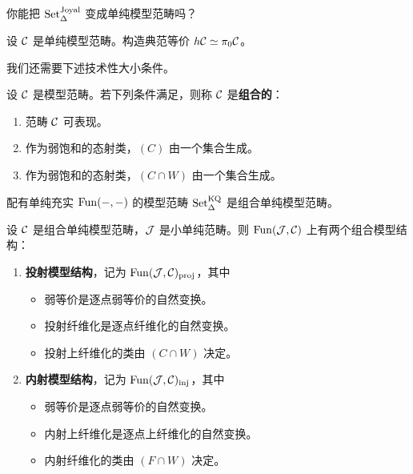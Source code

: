 \begin{exercise}\label{L8-2.5}
你能把 $\operatorname{Set}^{\mathrm{Joyal}}_\Delta$ 变成单纯模型范畴吗？
\end{exercise}

\begin{exercise}\label{L8-2.6}
设 $\mathcal{C}$ 是单纯模型范畴。构造典范等价 $h\mathcal{C}\simeq \pi_0\mathcal{C}$。
\end{exercise}

\nitem\label{L8-2.7} 我们还需要下述技术性大小条件。

\begin{definition}[HTT.A.2.6.1]\label{L8-2.8}
设 $\mathcal{C}$ 是模型范畴。若下列条件满足，则称 $\mathcal{C}$ 是\textbf{组合的}：
\begin{enumerate}[label=(\alph*),leftmargin=2.4em,itemsep=0.1em]
\item 范畴 $\mathcal{C}$ 可表现。
\item 作为弱饱和的态射类，$(C)$ 由一个集合生成。
\item 作为弱饱和的态射类，$(C\cap W)$ 由一个集合生成。
\end{enumerate}
\end{definition}

\begin{example}\label{L8-2.9}
配有单纯充实 $\operatorname{Fun}(-,-)$ 的模型范畴 $\operatorname{Set}^{\mathrm{KQ}}_\Delta$ 是组合单纯模型范畴。
\end{example}

\begin{theoremdef}[HTT.A.3.3.2]\label{L8-2.10}
设 $\mathcal{C}$ 是组合单纯模型范畴，$\mathcal{J}$ 是小单纯范畴。则 $\operatorname{Fun}(\mathcal{J},\mathcal{C})$ 上有两个组合模型结构：
\begin{enumerate}[label=(\arabic*),leftmargin=2.4em,itemsep=0.3em]
\item \textbf{投射模型结构}，记为 $\operatorname{Fun}(\mathcal{J},\mathcal{C})_{\mathrm{proj}}$，其中
\begin{itemize}[leftmargin=2.8em,itemsep=0.1em]
\item[(W)] 弱等价是逐点弱等价的自然变换。
\item[(F)] 投射纤维化是逐点纤维化的自然变换。
\item[(C)] 投射上纤维化的类由 $(C\cap W)$ 决定。
\end{itemize}
\item \textbf{内射模型结构}，记为 $\operatorname{Fun}(\mathcal{J},\mathcal{C})_{\mathrm{inj}}$，其中
\begin{itemize}[leftmargin=2.8em,itemsep=0.1em]
\item[(W)] 弱等价是逐点弱等价的自然变换。
\item[(C)] 内射上纤维化是逐点上纤维化的自然变换。
\item[(F)] 内射纤维化的类由 $(F\cap W)$ 决定。
\end{itemize}
\end{enumerate}
\end{theoremdef}

